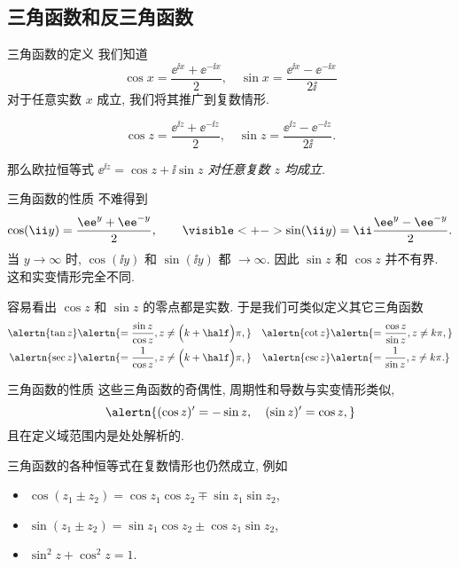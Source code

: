 \subsection{三角函数和反三角函数}

\begin{frame}{三角函数的定义}
	\onslide<+->
	我们知道
	\[
		\cos x=\frac{\ee^{\ii x}+\ee^{-\ii x}}2,\quad
		\sin x=\frac{\ee^{\ii x}-\ee^{-\ii x}}{2\ii}
	\]
	对于任意实数 $x$ 成立,
	\onslide<+->
	我们将其推广到复数情形.
	\onslide<+->
	\begin{definition*}[][余弦和正弦函数]
		\[
			\cos z=\frac{\ee^{\ii z}+\ee^{-\ii z}}2,\quad
			\sin z=\frac{\ee^{\ii z}-\ee^{-\ii z}}{2\ii}.
		\]
	\end{definition*}
	\onslide<+->
	那么欧拉恒等式 \emph{$\ee^{\ii z}=\cos z+\ii\sin z$ 对任意复数 $z$ 均成立}.
\end{frame}


\begin{frame}{三角函数的性质}
	\onslide<+->
	不难得到
	\[
		\cos(\ii y)=\dfrac{\ee^y+\ee^{-y}}2,\qquad
		\visible<+->{\sin(\ii y)=\ii\dfrac{\ee^y-\ee^{-y}}2.}
	\]
	\onslide<+->
	当 $y\to\infty$ 时, $\cos(\ii y)$ 和 $\sin(\ii y)$ 都 $\to\infty$.
	\onslide<+->
	因此 \alert{$\sin z$ 和 $\cos z$ 并不有界}. 
	\onslide<+->
	这和实变情形完全不同.

	\onslide<+->
	容易看出 $\cos z$ 和 $\sin z$ 的零点都是实数.
	\onslide<+->
	于是我们可类似定义其它三角函数
	\begin{align*}
		\alertn{\tan z}&
		\alertn{=\frac{\sin z}{\cos z},z\neq\Bigl(k+\half\Bigr)\pi,}&
		\alertn{\cot z}&
		\alertn{=\frac{\cos z}{\sin z},z\neq k\pi,}\\
		\alertn{\sec z}&
		\alertn{=\frac{1}{\cos z},z\neq\Bigl(k+\half\Bigr)\pi,}&
		\alertn{\csc z}&
		\alertn{=\frac{1}{\sin z},z\neq k\pi.}
	\end{align*}
\end{frame}


\begin{frame}{三角函数的性质}
	\onslide<+->
	这些三角函数的奇偶性, 周期性和导数与实变情形类似,
	\[
		\alertn{(\cos z)'=-\sin z,\quad
		(\sin z)'=\cos z,}
	\]
	\onslide<+->
	且在定义域范围内是处处解析的.

	\onslide<+->
	三角函数的各种恒等式在复数情形也仍然成立,
	\onslide<+->
	例如
	\begin{itemize}
		\item $\cos(z_1\pm z_2)=\cos z_1 \cos z_2\mp \sin z_1 \sin z_2$,
		\item $\sin(z_1\pm z_2)=\sin z_1 \cos z_2\pm\cos z_1 \sin z_2$,
		\item $\sin^2z+\cos^2z=1$.
	\end{itemize}
\end{frame}


